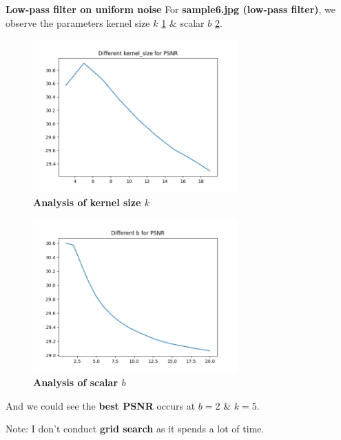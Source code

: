 \textbf{Low-pass filter on uniform noise}
For \textbf{sample6.jpg (low-pass filter)}, we observe the parameters kernel size $k$ \cref{fig3_6k} \& scalar $b$ \cref{fig3_6b}.
\begin{figure}
  \centering
  \includegraphics[width=0.7\textwidth]{image/sample6_paramkernel_size.png}
  \caption{\textbf{Analysis of kernel size $k$}}
  \label{fig3_6k}
\end{figure}
\begin{figure}
  \centering
  \includegraphics[width=0.7\textwidth]{image/sample6_paramb.png}
  \caption{\textbf{Analysis of scalar $b$}}
  \label{fig3_6b}
\end{figure}
And we could see the \textbf{best PSNR} occurs at $b=2$ \& $k=5$.

Note: I don't conduct \textbf{grid search} as it spends a lot of time.

